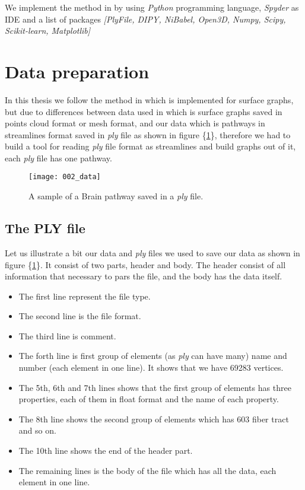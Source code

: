 \documentclass[../structure.tex]{subfiles}
\begin{document}
We implement the method in \cite{Amberg2007} by using \textit{Python} programming language, \textit{Spyder} as IDE and a list of packages \textit{[PlyFile, DIPY, NiBabel, Open3D, Numpy, Scipy, Scikit-learn, Matplotlib]}

\section{Data preparation}
\hspace{2em}In this thesis we follow the method in \cite{Amberg2007} which is implemented for surface graphs, but due to differences between data used in \cite{Amberg2007} which is surface graphs saved in points cloud format or mesh format, and our data which is pathways in streamlines format saved in \textit{ply} file as shown in figure \{\ref{fig:data}\}, therefore  we had to build a tool for reading \textit{ply} file format as streamlines and build graphs out of it, each \textit{ply} file has one pathway.

\begin{figure}[h!]
\centering
\texttt{[image: 002\_data]}
\captionsetup{justification=centering}
\caption{A sample of a Brain pathway saved in a \textit{ply} file.}
\label{fig:data}
\end{figure}

\subsection{The PLY file}
\hspace{2em}Let us illustrate a bit our data and \textit{ply} files we used to save our data as shown in figure \{\ref{fig:data}\}. It consist of two parts, header and body. The header consist of all information that necessary to pars the file, and the body has the data itself.
\begin{itemize}
\item The first line represent the file type.
\item The second line is the file format.
\item The third line is comment.
\item The forth line is first group of elements (as \textit{ply} can have many) name and number (each element in one line). It shows that we have 69283 vertices.
\item The 5th, 6th and 7th lines shows that the first group of elements has three properties, each of them in float format and the name of each property.
\item The 8th line shows the second group of elements which has 603 fiber tract and so on.
\item The 10th line shows the end of the header part.
\item The remaining lines is the body of the file which has all the data, each element in one line.
\end{itemize}
\end{document}
